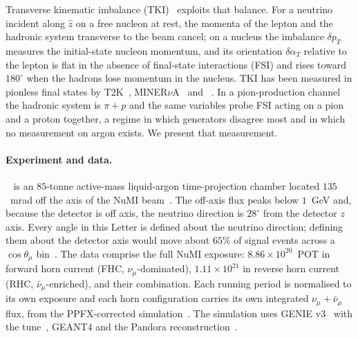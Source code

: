 \documentclass[aps,prl,twocolumn,superscriptaddress,nofootinbib,floatfix]{revtex4-2}
\begin{document}
Transverse kinematic imbalance (TKI)~\cite{lu_tki,furmanski_pn} exploits that balance. For a
neutrino incident along $\hat z$ on a free nucleon at rest, the momenta of the lepton and the
hadronic system transverse to the beam cancel; on a nucleus the imbalance $\delta p_T$ measures the
initial-state nucleon momentum, and its orientation $\delta\alpha_T$ relative to the lepton is
flat in the absence of final-state interactions (FSI) and rises toward $180^\circ$ when the
hadrons lose momentum in the nucleus. TKI has been measured in pionless final states by
T2K~\cite{t2k_tki}, MINER$\nu$A~\cite{minerva_tki} and \uboone{}~\cite{uboone_tki}. In a
pion-production channel the hadronic system is $\pi+p$ and the same variables probe FSI acting on
a pion and a proton together, a regime in which generators disagree most and in which no
measurement on argon exists. We present that measurement.

\paragraph*{Experiment and data.}
\uboone{}~\cite{uboone_nim} is an $85$-tonne active-mass liquid-argon time-projection chamber
located $135$~mrad off the axis of the NuMI beam~\cite{numi_beam}. The off-axis flux peaks below
$1$~GeV and, because the detector is off axis, the neutrino direction is $28^\circ$ from the
detector $z$ axis. Every angle in this Letter is defined about the neutrino direction; defining
them about the detector axis would move about $65\%$ of signal events across a $\cos\theta_\mu$
bin~\cite{companion_prd}. The data comprise the full NuMI exposure: $8.86\times10^{20}$~POT in
forward horn current (FHC, $\nu_\mu$-dominated), $1.11\times10^{21}$ in reverse horn current (RHC,
$\bar\nu_\mu$-enriched), and their combination. Each running period is normalised to its own
exposure and each horn configuration carries its own integrated $\nu_\mu+\bar\nu_\mu$ flux, from
the PPFX-corrected simulation~\cite{ppfx}. The simulation uses GENIE v3~\cite{genie3} with the
\uboone{} tune~\cite{uboone_tune}, GEANT4 and the Pandora reconstruction~\cite{pandora,uboone_pandora}.
\end{document}
